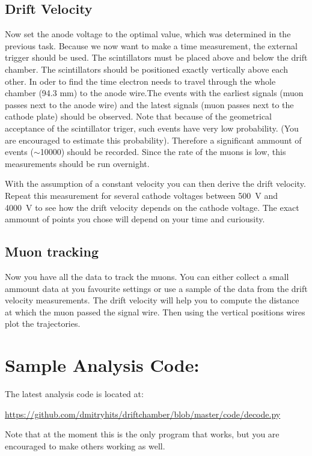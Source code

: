 \documentclass[12pt]{article}
\begin{document}
\subsection{Drift Velocity}
Now set the anode voltage to the optimal value, which was determined in the previous task. Because we now want to make a time measurement, the external trigger should be used. The scintillators must be placed above and below the drift chamber. The scintillators should be positioned exactly vertically above each other. In oder to find the time electron needs to travel through the whole chamber (94.3 mm) to the anode wire.The events with the earliest signals (muon passes next to the anode wire) and the latest signals (muon passes next to the cathode plate) should be observed. Note that because of the geometrical acceptance of the scintillator triger, such events have very low probability. (You are encouraged to estimate this probability). Therefore a significant ammount of events ($\sim$10000) should be recorded. Since the rate of the muons is low, this measurements should be run overnight.

 With the assumption of a constant velocity you can then derive the drift velocity. Repeat this measurement for several cathode voltages between \SI{500}{\volt} and \SI{4000}{\volt} to see how the drift velocity depends on the cathode voltage. The exact ammount of points you chose will depend on your time and curiousity.

\subsection{Muon tracking}

Now you have all the data to track the muons. You can either collect a small ammount data at you favourite settings or use a sample of the data from the drift velocity measurements.  The drift velocity will help you to compute the distance at which the muon passed the signal wire. Then using the vertical positions wires plot the trajectories.




\pagebreak

\appendix
\section{Sample Analysis Code:}

The latest analysis code is located at:

\url{https://github.com/dmitryhits/driftchamber/blob/master/code/decode.py}

Note that at the moment this is the only program that works, but you are encouraged to make others working as well.



\end{document}
